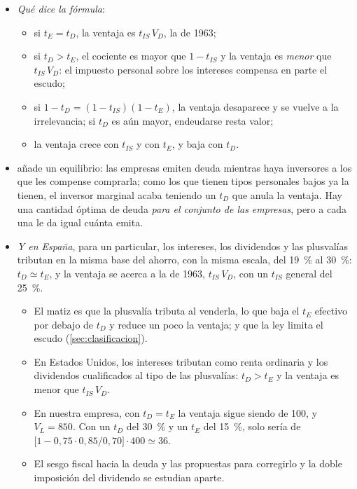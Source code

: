 \documentclass[11pt]{article}
\begin{document}
\begin{itemize}
\item \emph{Qué dice la fórmula}:
  \begin{itemize}
  \item si $t_E=t_D$, la ventaja es $t_{IS}\,V_D$, la de 1963;
  \item si $t_D>t_E$, el cociente es mayor que $1-t_{IS}$ y la ventaja es \emph{menor} que $t_{IS}\,V_D$: el impuesto personal sobre los intereses compensa en parte el escudo;
  \item si $1-t_D=(1-t_{IS})(1-t_E)$, la ventaja desaparece y se vuelve a la irrelevancia; si $t_D$ es aún mayor, endeudarse resta valor;
  \item la ventaja crece con $t_{IS}$ y con $t_E$, y baja con $t_D$.
  \end{itemize}
\item {} añade un equilibrio: las empresas emiten deuda mientras haya inversores a los que les compense comprarla; como los que tienen tipos personales bajos ya la tienen, el inversor marginal acaba teniendo un $t_D$ que anula la ventaja. Hay una cantidad óptima de deuda \emph{para el conjunto de las empresas}, pero a cada una le da igual cuánta emita.
\item \emph{Y en España}, para un particular, los intereses, los dividendos y las plusvalías tributan en la misma base del ahorro, con la misma escala, del 19~\% al 30~\%\nocite{LIRPF2006}: $t_D\simeq t_E$, y la ventaja se acerca a la de 1963, $t_{IS}\,V_D$, con un $t_{IS}$ general del 25~\%\nocite{LIS2014}.
  \begin{itemize}
  \item El matiz es que la plusvalía tributa al venderla, lo que baja el $t_E$ efectivo por debajo de $t_D$ y reduce un poco la ventaja; y que la ley limita el escudo (\ref{sec:clasificacion}).
  \item En Estados Unidos, los intereses tributan como renta ordinaria y los dividendos cualificados al tipo de las plusvalías\nocite{IRS2026Topic404}: $t_D>t_E$ y la ventaja es menor que $t_{IS}\,V_D$.
  \item En nuestra empresa, con $t_D=t_E$ la ventaja sigue siendo de 100, y $V_L=850$. Con un $t_D$ del 30~\% y un $t_E$ del 15~\%, solo sería de $\big[1-0{,}75\cdot0{,}85/0{,}70\big]\cdot400\simeq36$.
  \item El sesgo fiscal hacia la deuda y las propuestas para corregirlo  y la doble imposición del dividendo  se estudian aparte.
  \end{itemize}
\end{itemize}
\end{document}

